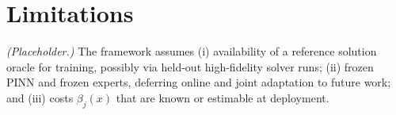 \section*{Limitations}
\label{sec:limitations}

\emph{(Placeholder.)} The framework assumes (i) availability of a reference
solution oracle for training, possibly via held-out high-fidelity solver
runs; (ii) frozen PINN and frozen experts, deferring online and joint
adaptation to future work; and (iii) costs $\beta_j(x)$ that are known or
estimable at deployment.
